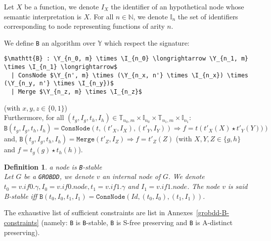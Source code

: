 \documentclass[a4paper,10pt]{article}
\newcommand{\N}{\mathbb{N}}%
\newcommand{\Y}{\mathbb{Y}}
\newcommand{\I}{\mathbb{I}}
\newcommand{\T}{\mathbb{T}}
\newcommand{\GroBdd}{\texttt{GROBDD}}
\newtheorem{newdef}{Definition}
\newcommand{\definition}[2]{\begin{newdef}{#1\\}#2\end{newdef}}
\begin{document}
Let $X$ be a function, we denote $I_X$ the identifier of an hypothetical node whose semantic interpretation is $X$.
For all $n\in\N$, we denote $\I_n$ the set of identifiers corresponding to node representing functions of arity $n$.

We define \texttt{B} an algorithm over $\Y$ which respect the signature:
\begin{lstlisting}
$\mathtt{B} : \Y_{n_0, m} \times \I_{n_0} \longrightarrow \Y_{n_1, m} \times \I_{n_1} \longrightarrow$
  | ConsNode $\Y_{n', m} \times (\Y_{n_x, n'} \times \I_{n_x}) \times (\Y_{n_y, n'} \times \I_{n_y})$
  | Merge $\Y_{n_z, m} \times \I_{n_z}$
\end{lstlisting}
(with $x, y, z \in \{0, 1\}$) \\
Furthermore, for all $(t_g, I_g, t_h, I_h) \in \T_{n_0, m} \times \I_{n_0} \times \T_{n_1, m} \times \I_{n_1}$:
$\texttt{B}(t_g, I_g, t_h, I_h) = \texttt{ConsNode} (t, (t'_X, I_X), (t'_Y, I_Y)) \Rightarrow f = t\left(t'_X(X) \star t'_Y(Y))\right)$
and, $\texttt{B}(t_g, I_g, t_h, I_h) = \texttt{Merge} (t'_Z, I_Z) \Rightarrow f = t'_Z(Z)$ (with $X, Y, Z \in\{g, h\}$ and $f = t_g(g) \star t_h(h)$).

\definition{a node is \texttt{B}-stable}
{
Let $G$ be a \GroBdd{}, we denote $v$ an internal node of $G$.
We denote $t_0 = v.if0.\gamma, I_0 = v.if0.node, t_1 = v.if1.\gamma$ and $I_1 = v.if1.node$.
The node $v$ is said B-stable iff $\mathtt{B}(t_0, I_0, t_1, I_1) = \mathtt{ConsNode}(Id, (t_0, I_0), (t_1, I_1))$.
}

The exhaustive list of sufficient constraints are list in Annexes~\ref{grobdd-B-constraints} (namely: \texttt{B} is \texttt{B}-stable, \texttt{B} is S-free preserving and \texttt{B} is A-distinct preserving).
\end{document}
